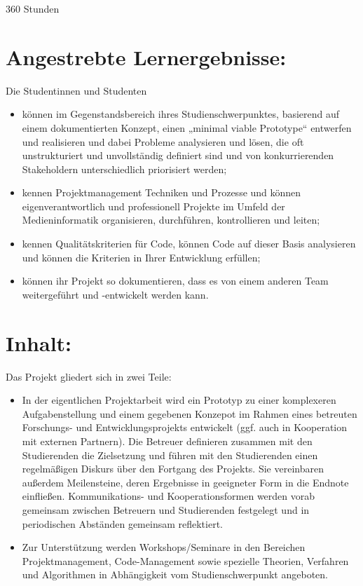 360 Stunden

\section*{Angestrebte
Lernergebnisse:}\label{angestrebte-lernergebnisse-8}

Die Studentinnen und Studenten

\begin{itemize}
\tightlist
\item
  können im Gegenstandsbereich ihres Studienschwerpunktes, basierend auf
  einem dokumentierten Konzept, einen „minimal viable Prototype``
  entwerfen und realisieren und dabei Probleme analysieren und lösen,
  die oft unstrukturiert und unvollständig definiert sind und von
  konkurrierenden Stakeholdern unterschiedlich priorisiert werden;
\item
  kennen Projektmanagement Techniken und Prozesse und können
  eigenverantwortlich und professionell Projekte im Umfeld der
  Medieninformatik organisieren, durchführen, kontrollieren und leiten;
\item
  kennen Qualitätskriterien für Code, können Code auf dieser Basis
  analysieren und können die Kriterien in Ihrer Entwicklung erfüllen;
\item
  können ihr Projekt so dokumentieren, dass es von einem anderen Team
  weitergeführt und -entwickelt werden kann.
\end{itemize}

\section*{Inhalt:}\label{inhalt-8}

Das Projekt gliedert sich in zwei Teile:

\begin{itemize}
\tightlist
\item
  In der eigentlichen Projektarbeit wird ein Prototyp zu einer
  komplexeren Aufgabenstellung und einem gegebenen Konzepot im Rahmen
  eines betreuten Forschungs- und Entwicklungsprojekts entwickelt (ggf.
  auch in Kooperation mit externen Partnern). Die Betreuer definieren
  zusammen mit den Studierenden die Zielsetzung und führen mit den
  Studierenden einen regelmäßigen Diskurs über den Fortgang des
  Projekts. Sie vereinbaren außerdem Meilensteine, deren Ergebnisse in
  geeigneter Form in die Endnote einfließen. Kommunikations- und
  Kooperationsformen werden vorab gemeinsam zwischen Betreuern und
  Studierenden festgelegt und in periodischen Abständen gemeinsam
  reflektiert.
\item
  Zur Unterstützung werden Workshops/Seminare in den Bereichen
  Projektmanagement, Code-Management sowie spezielle Theorien, Verfahren
  und Algorithmen in Abhängigkeit vom Studienschwerpunkt angeboten.
\end{itemize}

